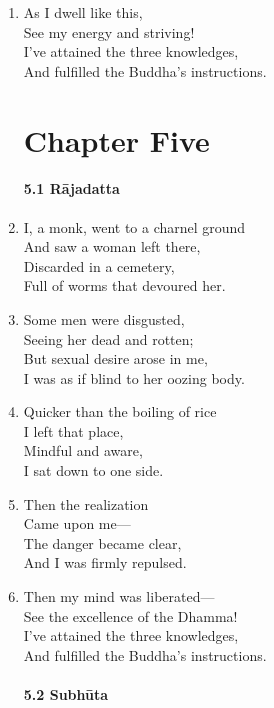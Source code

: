 \documentclass[10pt, openany]{book}
\begin{document}
\begin{enumerate}
\item As I dwell like this,\\
See my energy and striving!\\
I’ve attained the three knowledges,\\
And fulfilled the Buddha’s instructions.

\chapter*{Chapter Five}

\subsubsection*{5.1 Rājadatta}

\item I, a monk, went to a charnel ground\\
And saw a woman left there,\\
Discarded in a cemetery,\\
Full of worms that devoured her.

\item Some men were disgusted,\\
Seeing her dead and rotten;\\
But sexual desire arose in me,\\
I was as if blind to her oozing body.

\item Quicker than the boiling of rice\\
I left that place,\\
Mindful and aware,\\
I sat down to one side.

\item Then the realization\\
Came upon me—\\
The danger became clear,\\
And I was firmly repulsed.

\item Then my mind was liberated—\\
See the excellence of the Dhamma!\\
I’ve attained the three knowledges,\\
And fulfilled the Buddha’s instructions.

\subsubsection*{5.2 Subhūta}


\end{enumerate}
\end{document}
